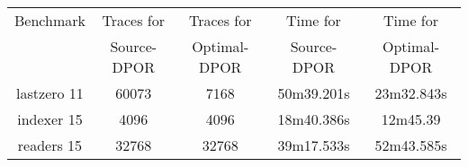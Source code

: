 \begin{center}
\begin{tabular}{ |c|c|c|c|c| }
\hline
Benchmark & Traces for& Traces for & Time for& Time for\\
 & Source-DPOR & Optimal-DPOR & Source-DPOR & Optimal-DPOR \\
\hline \hline
lastzero 11 & 60073 & 7168 & 50m39.201s & 23m32.843s \\
\hline
indexer 15 &  4096 & 4096 & 18m40.386s & 12m45.39\\
\hline
readers 15 &  32768 & 32768 & 39m17.533s & 52m43.585s \\
\hline
\end{tabular}
\end{center}
